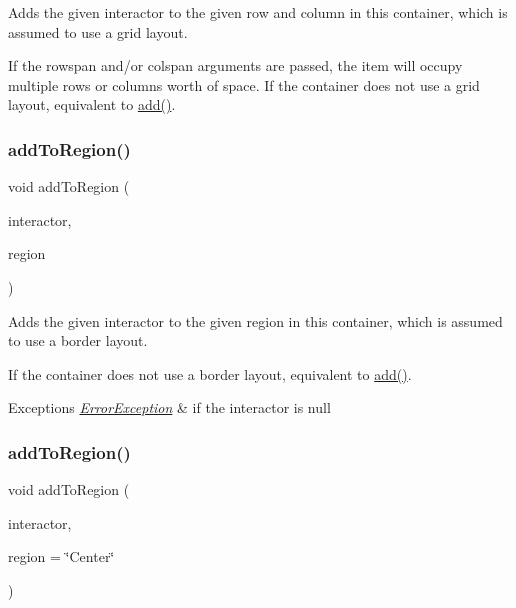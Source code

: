 Adds the given interactor to the given row and column in this container, which is assumed to use a grid layout. 

If the rowspan and/or colspan arguments are passed, the item will occupy multiple rows or columns\textquotesingle{} worth of space. If the container does not use a grid layout, equivalent to \mbox{\hyperlink{classGContainer_a6f99b7c841256dbdc5acaafbbca4e685}{add()}}. \mbox{\label{classGContainer_aab55413917cdbb2e0560ab415d59fd1f}} 
\subsubsection{\texorpdfstring{add\+To\+Region()}{addToRegion()}\hspace{0.1cm}{\footnotesize\ttfamily [1/4]}}
{\footnotesize\ttfamily void add\+To\+Region (\begin{DoxyParamCaption}\item[{\mbox{\hyperlink{classGInteractor}{G\+Interactor}} $\ast$}]{interactor,  }\item[{\mbox{\hyperlink{classGContainer_a81a01a86de31071a92e6cce0bab9bc4b}{Region}}}]{region }\end{DoxyParamCaption})\hspace{0.3cm}{\ttfamily [virtual]}}



Adds the given interactor to the given region in this container, which is assumed to use a border layout. 

If the container does not use a border layout, equivalent to \mbox{\hyperlink{classGContainer_a6f99b7c841256dbdc5acaafbbca4e685}{add()}}. 
\begin{DoxyExceptions}{Exceptions}
{\em \mbox{\hyperlink{classErrorException}{Error\+Exception}}} & if the interactor is null \\
\hline
\end{DoxyExceptions}
\mbox{\label{classGContainer_a9c8e600889001e6e72d3548918a6baff}} 
\subsubsection{\texorpdfstring{add\+To\+Region()}{addToRegion()}\hspace{0.1cm}{\footnotesize\ttfamily [2/4]}}
{\footnotesize\ttfamily void add\+To\+Region (\begin{DoxyParamCaption}\item[{\mbox{\hyperlink{classGInteractor}{G\+Interactor}} $\ast$}]{interactor,  }\item[{const std\+::string \&}]{region = {\ttfamily \char`\"{}Center\char`\"{}} }\end{DoxyParamCaption})\hspace{0.3cm}{\ttfamily [virtual]}}



